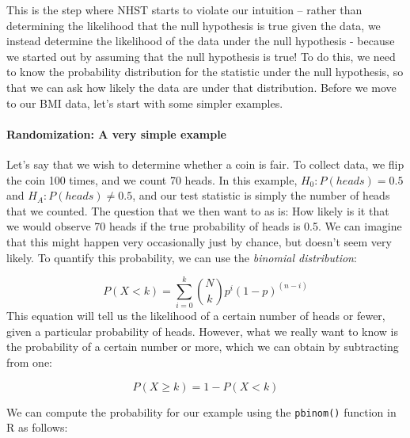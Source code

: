 \documentclass[]{book}
\newenvironment{Shaded}{\begin{snugshade}}{\end{snugshade}}
\newcommand{\KeywordTok}[1]{\textcolor[rgb]{0.13,0.29,0.53}{\textbf{#1}}}
\newcommand{\DecValTok}[1]{\textcolor[rgb]{0.00,0.00,0.81}{#1}}
\newcommand{\FloatTok}[1]{\textcolor[rgb]{0.00,0.00,0.81}{#1}}
\newcommand{\StringTok}[1]{\textcolor[rgb]{0.31,0.60,0.02}{#1}}
\newcommand{\CommentTok}[1]{\textcolor[rgb]{0.56,0.35,0.01}{\textit{#1}}}
\newcommand{\NormalTok}[1]{#1}
\let\oldparagraph\paragraph
\renewcommand{\paragraph}[1]{\oldparagraph{#1}\mbox{}}
\theoremstyle{definition}
\theoremstyle{definition}
\theoremstyle{definition}
\theoremstyle{remark}
\begin{document}
This is the step where NHST starts to violate our intuition -- rather
than determining the likelihood that the null hypothesis is true given
the data, we instead determine the likelihood of the data under the null
hypothesis - because we started out by assuming that the null hypothesis
is true! To do this, we need to know the probability distribution for
the statistic under the null hypothesis, so that we can ask how likely
the data are under that distribution. Before we move to our BMI data,
let's start with some simpler examples.

\paragraph{Randomization: A very simple
example}\label{randomization-a-very-simple-example}

Let's say that we wish to determine whether a coin is fair. To collect
data, we flip the coin 100 times, and we count 70 heads. In this
example, \(H_0: P(heads)=0.5\) and \(H_A: P(heads) \neq 0.5\), and our
test statistic is simply the number of heads that we counted. The
question that we then want to as is: How likely is it that we would
observe 70 heads if the true probability of heads is 0.5. We can imagine
that this might happen very occasionally just by chance, but doesn't
seem very likely. To quantify this probability, we can use the
\emph{binomial distribution}:

\[
P(X < k) = \sum_{i=0}^k \binom{N}{k} p^i (1-p)^{(n-i)}
\] This equation will tell us the likelihood of a certain number of
heads or fewer, given a particular probability of heads. However, what
we really want to know is the probability of a certain number or more,
which we can obtain by subtracting from one:

\[
P(X \ge k) = 1 - P(X < k)
\]

We can compute the probability for our example using the
\texttt{pbinom()} function in R as follows:

\begin{Shaded}
\end{Shaded}
\end{document}
